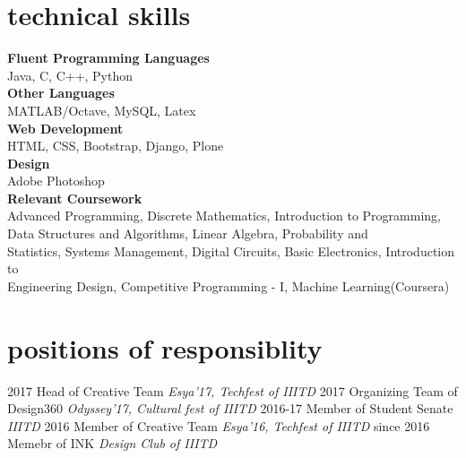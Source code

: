 \documentclass[]{friggeri-cv}
\begin{document}
\section{technical skills}

\begin{entrylist}

    {\textbf{Fluent Programming Languages}}\\
    \vspace{0.5em}
    Java, C, C++, Python\\
    {\textbf{Other Languages}}\\
    \vspace{0.5em}
    MATLAB/Octave, MySQL, Latex\\
    {\textbf{Web Development}}\\
    \vspace{0.5em}
    HTML, CSS, Bootstrap, Django, Plone\\
    {\textbf{Design}}\\
    \vspace{0.5em}
    Adobe Photoshop\\
    {\textbf{Relevant Coursework}}\\
    Advanced Programming, Discrete Mathematics, Introduction to Programming,\\
    Data Structures and Algorithms, Linear Algebra, Probability and\\
    Statistics, Systems Management, Digital Circuits, Basic Electronics, Introduction to\\
    \vspace{0.5em}
    Engineering Design, Competitive Programming - I, Machine Learning(Coursera)\\


\end{entrylist}
\section{positions of responsiblity}

\begin{entrylist}
  \entry
    {2017}
    {Head of Creative Team}
    {}
    {\emph{Esya'17, Techfest of IIITD}}
  \entry
    {2017}
    {Organizing Team of Design360}
    {}
    {\emph{Odyssey'17, Cultural fest of IIITD}}
  \entry
    {2016-17}
    {Member of Student Senate}
    {}
    {\emph{IIITD}}
  \entry
    {2016}
    {Member of Creative Team}
    {}
    {\emph{Esya'16, Techfest of IIITD}}
  \entry
    {since 2016}
    {Memebr of INK}
    {}
    {\emph{Design Club of IIITD}}
\end{entrylist}
\end{document}
